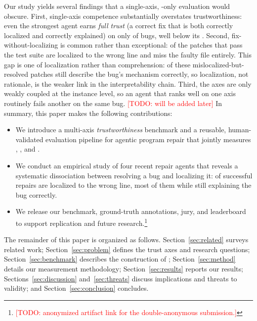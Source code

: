 Our study yields several findings that a single-axis, \accuracy{}-only evaluation would
obscure. First, single-axis competence substantially overstates trustworthiness: even the
strongest agent earns \emph{full trust} (a correct fix that is both correctly localized
and correctly explained) on only \fullTrustBest{} of bugs, well below its \accuracy{}. Second,
fix-without-localizing is common rather than exceptional: \mislocRate{} of the patches that
pass the test suite are localized to the wrong line and \wrongFileRate{} miss the faulty file
entirely. This gap is one of localization rather than comprehension: \understoodShare{} of
these mislocalized-but-resolved patches still describe the bug's mechanism correctly, so
localization, not rationale, is the weaker link in the interpretability chain. Third, the
axes are only weakly coupled at the instance level, so an agent that ranks well on one axis
routinely fails another on the same bug. \textcolor{red}{[TODO: will be added later]} In summary, this paper makes the following contributions:

\begin{itemize}
  \item We introduce a multi-axis \emph{trustworthiness} benchmark and a reusable,
  human-validated evaluation pipeline for agentic program repair that jointly measures
  \accuracy{}, \interpretability{}, and \robustness{}.
  \item We conduct an empirical study of four recent repair agents that reveals a
  systematic dissociation between resolving a bug and localizing it: \mislocRate{} of
  successful repairs are localized to the wrong line, most of them while still explaining the
  bug correctly.
  \item We release our benchmark, ground-truth annotations, jury, and leaderboard to
  support replication and future research.\footnote{\textcolor{red}{[TODO: anonymized
  artifact link for the double-anonymous submission.]}}
\end{itemize}

The remainder of this paper is organized as follows. Section~\ref{sec:related} surveys
related work; Section~\ref{sec:problem} defines the trust axes and research questions;
Section~\ref{sec:benchmark} describes the construction of \trustRepair{};
Section~\ref{sec:method} details our measurement methodology; Section~\ref{sec:results}
reports our results; Sections~\ref{sec:discussion} and~\ref{sec:threats} discuss
implications and threats to validity; and Section~\ref{sec:conclusion} concludes.
